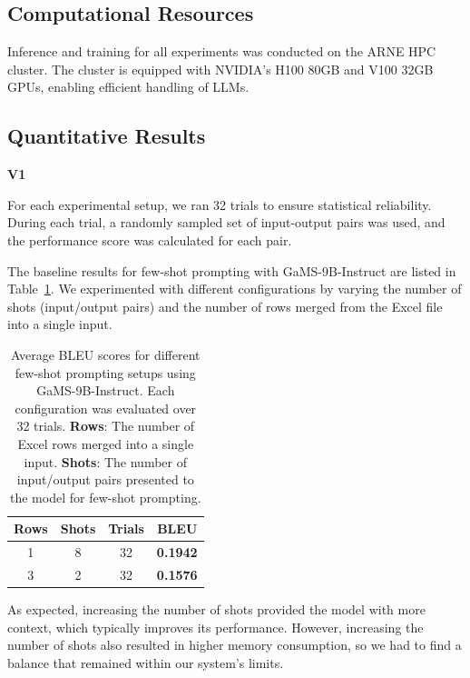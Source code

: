 \documentclass[fleqn,moreauthors,10pt]{ds_report}
\begin{document}
\subsection*{Computational Resources}

Inference and training for all experiments was conducted on the ARNE HPC cluster. The cluster is equipped with NVIDIA's H100 80GB and V100 32GB GPUs, enabling efficient handling of LLMs.

\subsection*{Quantitative Results}

\vspace{1em} %
\noindent \textbf{V1}
\vspace{0.5em} %

For each experimental setup, we ran 32 trials to ensure statistical reliability. During each trial, a randomly sampled
set of input-output pairs was used, and the performance score was calculated for each pair.


The baseline results for few-shot prompting with GaMS-9B-Instruct \cite{huggingface2025gams9b} are listed in Table~\ref{tab:bleu-results}. We experimented with different configurations by varying the number of shots (input/output pairs) and the number of rows merged from the Excel file into a single input.
\begin{table}[h!]
    \centering
    \caption{Average BLEU scores for different few-shot prompting setups using GaMS-9B-Instruct. Each configuration was evaluated over 32 trials. \textbf{Rows}: The number of Excel rows merged into a single input. \textbf{Shots}: The number of input/output pairs presented to the model for few-shot prompting.}
    \label{tab:bleu-results}
    \small
    \begin{tabular}{@{}cccc@{}}
    \toprule
    \textbf{Rows} & \textbf{Shots} & \textbf{Trials} & \textbf{BLEU} \\
    \midrule
    1 & 8 & 32 & \textbf{0.1942} \\
    3 & 2 & 32 & \textbf{0.1576} \\
    \bottomrule
    \end{tabular}
\end{table}

As expected, increasing the number of shots provided the model with more context, which typically improves its performance. However, increasing the number of shots also resulted in higher memory consumption, so we had to find a balance that remained within our system's limits.
\end{document}
